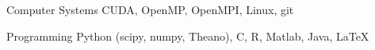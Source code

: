 

\begin{cvskills}


  \cvskill
    {Computer Systems} %
    {CUDA, OpenMP, OpenMPI, Linux, git} %

  \cvskill
    {Programming} %
    {Python (scipy, numpy, Theano), C, R, Matlab, Java, \LaTeX} %
    
\end{cvskills}
